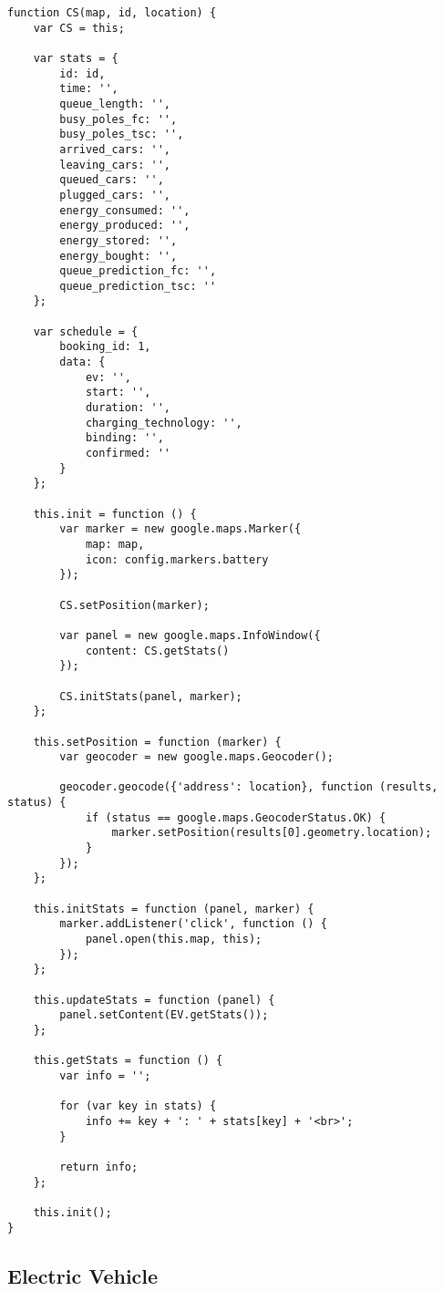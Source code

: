 \begin{verbatim}
function CS(map, id, location) {
    var CS = this;

    var stats = {
        id: id,
        time: '',
        queue_length: '',
        busy_poles_fc: '',
        busy_poles_tsc: '',
        arrived_cars: '',
        leaving_cars: '',
        queued_cars: '',
        plugged_cars: '',
        energy_consumed: '',
        energy_produced: '',
        energy_stored: '',
        energy_bought: '',
        queue_prediction_fc: '',
        queue_prediction_tsc: ''
    };

    var schedule = {
        booking_id: 1,
        data: {
            ev: '',
            start: '',
            duration: '',
            charging_technology: '',
            binding: '',
            confirmed: ''
        }
    };

    this.init = function () {
        var marker = new google.maps.Marker({
            map: map,
            icon: config.markers.battery
        });

        CS.setPosition(marker);

        var panel = new google.maps.InfoWindow({
            content: CS.getStats()
        });

        CS.initStats(panel, marker);
    };

    this.setPosition = function (marker) {
        var geocoder = new google.maps.Geocoder();

        geocoder.geocode({'address': location}, function (results, status) {
            if (status == google.maps.GeocoderStatus.OK) {
                marker.setPosition(results[0].geometry.location);
            }
        });
    };

    this.initStats = function (panel, marker) {
        marker.addListener('click', function () {
            panel.open(this.map, this);
        });
    };

    this.updateStats = function (panel) {
        panel.setContent(EV.getStats());
    };

    this.getStats = function () {
        var info = '';

        for (var key in stats) {
            info += key + ': ' + stats[key] + '<br>';
        }

        return info;
    };

    this.init();
}
\end{verbatim}


\newpage
\subsection{Electric Vehicle}

